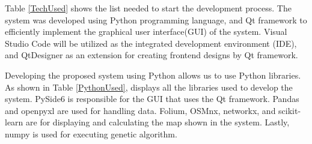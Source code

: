 	Table \ref{TechUsed} shows the list needed to start the development process. The system was developed using Python programming language, and Qt framework to efficiently implement the graphical user interface(GUI) of the system. Visual Studio Code will be utilized as the integrated development environment (IDE), and QtDesigner as an extension for creating frontend designs by Qt framework.
	
	\begin{table}[h]
		\centering
		\caption{List of tools and technologies used in the development process}
		\label{TechUsed}
	\end{table}
	
	Developing the proposed system using Python allows us to use Python libraries. As shown in Table \ref{PythonUsed}, displays all the libraries used to develop the system. PySide6 is responsible for the GUI that uses the Qt framework. Pandas and openpyxl are used for handling data. Folium, OSMnx, networkx, and scikit-learn are for displaying and calculating the map shown in the system. Lastly, numpy is used for executing genetic algorithm.
	
